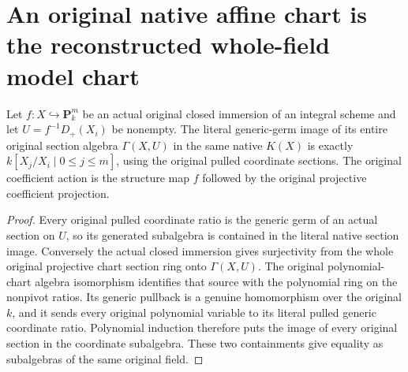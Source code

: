 \section{An original native affine chart is the reconstructed whole-field model chart}
\label{sec:projective-native-model-chart-algebra}

\begin{theorem}
\label{thm:projective-native-chart-section-algebra}
\leanok
{}
Let $f:X\hookrightarrow\mathbf P^m_k$ be an actual original closed
immersion of an integral scheme and let $U=f^{-1}D_+(X_i)$ be nonempty.
The literal generic-germ image of its entire original section algebra
$\Gamma(X,U)$ in the same native $K(X)$ is exactly
$k[X_j/X_i\mid 0\leq j\leq m]$, using the original pulled coordinate
sections. The original coefficient action is the structure map
$f$ followed by the original projective coefficient projection.
\end{theorem}
\begin{proof}
Every original pulled coordinate ratio is the generic germ of an actual
section on $U$, so its generated subalgebra is contained in the literal
native section image. Conversely the actual closed immersion gives
surjectivity from the whole original projective chart section ring onto
$\Gamma(X,U)$. The original polynomial-chart algebra isomorphism
identifies that source with the polynomial ring on the nonpivot ratios.
Its generic pullback is a genuine homomorphism over the original $k$,
and it sends every original polynomial variable to its literal pulled
generic coordinate ratio. Polynomial induction therefore puts the image
of every original section in the coordinate subalgebra. These two
containments give equality as subalgebras of the same original field.
\end{proof}

